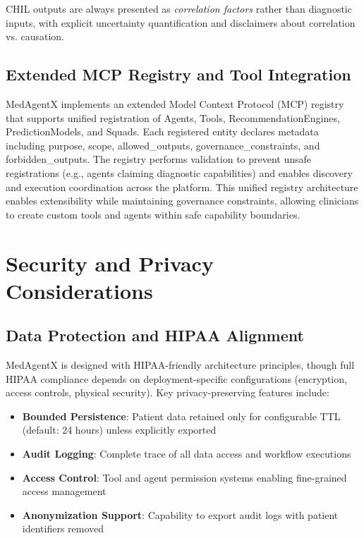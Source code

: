 \documentclass[journal]{IEEEtran}
\begin{document}
CHIL outputs are always presented as \textit{correlation factors} rather than diagnostic inputs, with explicit uncertainty quantification and disclaimers about correlation vs. causation.

\subsection{Extended MCP Registry and Tool Integration}
MedAgentX implements an extended Model Context Protocol (MCP) registry that supports unified registration of Agents, Tools, RecommendationEngines, PredictionModels, and Squads. Each registered entity declares metadata including purpose, scope, allowed\_outputs, governance\_constraints, and forbidden\_outputs. The registry performs validation to prevent unsafe registrations (e.g., agents claiming diagnostic capabilities) and enables discovery and execution coordination across the platform. This unified registry architecture enables extensibility while maintaining governance constraints, allowing clinicians to create custom tools and agents within safe capability boundaries.

\section{Security and Privacy Considerations}
\label{sec:security}

\subsection{Data Protection and HIPAA Alignment}
MedAgentX is designed with HIPAA-friendly architecture principles, though full HIPAA compliance depends on deployment-specific configurations (encryption, access controls, physical security). Key privacy-preserving features include:

\begin{itemize}
    \item \textbf{Bounded Persistence}: Patient data retained only for configurable TTL (default: 24 hours) unless explicitly exported
    \item \textbf{Audit Logging}: Complete trace of all data access and workflow executions
    \item \textbf{Access Control}: Tool and agent permission systems enabling fine-grained access management
    \item \textbf{Anonymization Support}: Capability to export audit logs with patient identifiers removed
\end{itemize}
\end{document}
